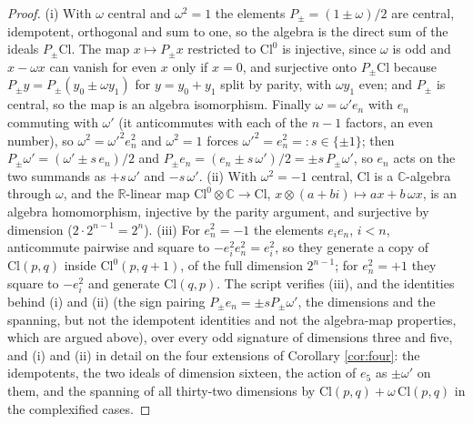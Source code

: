 \documentclass[11pt]{article}
\theoremstyle{definition}
\newcommand{\Cl}{\mathrm{Cl}}
\newcommand{\R}{\mathbb{R}}
\newcommand{\C}{\mathbb{C}}
\begin{document}
\begin{proof}
(i) With $\omega$ central and $\omega^{2} = 1$ the elements $P_{\pm} = (1 \pm \omega)/2$ are central, idempotent, orthogonal and sum to one, so the algebra is the direct sum of the ideals $P_{\pm}\Cl$. The map $x \mapsto P_{\pm}x$ restricted to $\Cl^{0}$ is injective, since $\omega$ is odd and $x - \omega x$ can vanish for even $x$ only if $x = 0$, and surjective onto $P_{\pm}\Cl$ because $P_{\pm}y = P_{\pm}(y_{0} \pm \omega y_{1})$ for $y = y_{0} + y_{1}$ split by parity, with $\omega y_{1}$ even; and $P_{\pm}$ is central, so the map is an algebra isomorphism. Finally $\omega = \omega' e_{n}$ with $e_{n}$ commuting with $\omega'$ (it anticommutes with each of the $n - 1$ factors, an even number), so $\omega^{2} = \omega'^{2}e_{n}^{2}$ and $\omega^{2} = 1$ forces $\omega'^{2} = e_{n}^{2} =: s \in \{\pm 1\}$; then $P_{\pm}\omega' = (\omega' \pm s\,e_{n})/2$ and $P_{\pm}e_{n} = (e_{n} \pm s\,\omega')/2 = \pm s\,P_{\pm}\omega'$, so $e_{n}$ acts on the two summands as $+s\,\omega'$ and $-s\,\omega'$. (ii) With $\omega^{2} = -1$ central, $\Cl$ is a $\C$-algebra through $\omega$, and the $\R$-linear map $\Cl^{0} \otimes \C \to \Cl$, $x \otimes (a + bi) \mapsto ax + b\,\omega x$, is an algebra homomorphism, injective by the parity argument, and surjective by dimension ($2 \cdot 2^{n-1} = 2^{n}$). (iii) For $e_{n}^{2} = -1$ the elements $e_{i}e_{n}$, $i < n$, anticommute pairwise and square to $-e_{i}^{2}e_{n}^{2} = e_{i}^{2}$, so they generate a copy of $\Cl(p,q)$ inside $\Cl^{0}(p, q+1)$, of the full dimension $2^{n-1}$; for $e_{n}^{2} = +1$ they square to $-e_{i}^{2}$ and generate $\Cl(q,p)$. The script verifies (iii), and the identities behind (i) and (ii) (the sign pairing $P_{\pm}e_{n} = \pm s P_{\pm}\omega'$, the dimensions and the spanning, but not the idempotent identities and not the algebra-map properties, which are argued above), over every odd signature of dimensions three and five, and (i) and (ii) in detail on the four extensions of Corollary \ref{cor:four}: the idempotents, the two ideals of dimension sixteen, the action of $e_{5}$ as $\pm\omega'$ on them, and the spanning of all thirty-two dimensions by $\Cl(p,q) + \omega\,\Cl(p,q)$ in the complexified cases.
\end{proof}
\end{document}
